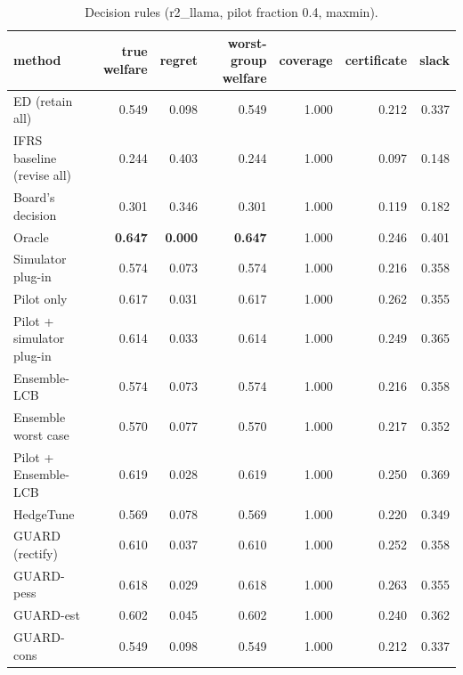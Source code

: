 \begin{table}[t]
\centering
\small
\begin{tabular}{lrrrrrr}
\toprule
method & true welfare & regret & worst-group welfare & coverage & certificate & slack \\
\midrule
ED (retain all) & 0.549 & 0.098 & 0.549 & 1.000 & 0.212 & 0.337 \\
IFRS baseline (revise all) & 0.244 & 0.403 & 0.244 & 1.000 & 0.097 & 0.148 \\
Board's decision & 0.301 & 0.346 & 0.301 & 1.000 & 0.119 & 0.182 \\
Oracle & \textbf{0.647} & \textbf{0.000} & \textbf{0.647} & 1.000 & 0.246 & 0.401 \\
Simulator plug-in & 0.574 & 0.073 & 0.574 & 1.000 & 0.216 & 0.358 \\
Pilot only & 0.617 & 0.031 & 0.617 & 1.000 & 0.262 & 0.355 \\
Pilot + simulator plug-in & 0.614 & 0.033 & 0.614 & 1.000 & 0.249 & 0.365 \\
Ensemble-LCB & 0.574 & 0.073 & 0.574 & 1.000 & 0.216 & 0.358 \\
Ensemble worst case & 0.570 & 0.077 & 0.570 & 1.000 & 0.217 & 0.352 \\
Pilot + Ensemble-LCB & 0.619 & 0.028 & 0.619 & 1.000 & 0.250 & 0.369 \\
HedgeTune & 0.569 & 0.078 & 0.569 & 1.000 & 0.220 & 0.349 \\
GUARD (rectify) & 0.610 & 0.037 & 0.610 & 1.000 & 0.252 & 0.358 \\
GUARD-pess & 0.618 & 0.029 & 0.618 & 1.000 & 0.263 & 0.355 \\
GUARD-est & 0.602 & 0.045 & 0.602 & 1.000 & 0.240 & 0.362 \\
GUARD-cons & 0.549 & 0.098 & 0.549 & 1.000 & 0.212 & 0.337 \\
\bottomrule
\end{tabular}
\caption{Decision rules (r2\_llama, pilot fraction 0.4, maxmin).}
\label{tab:methods-maxmin}
\end{table}

